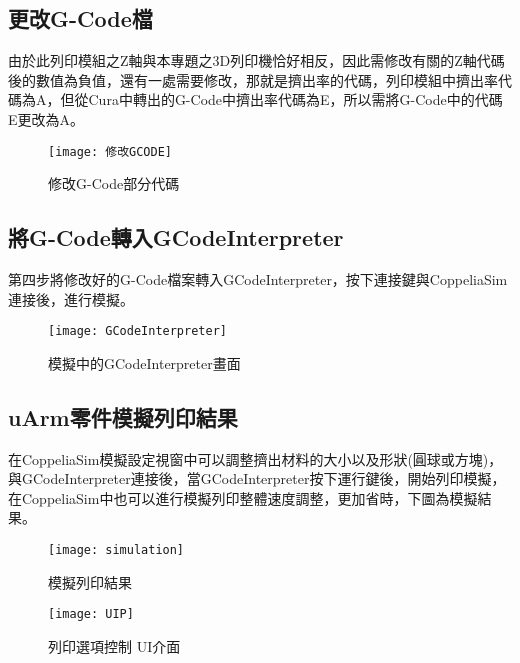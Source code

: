 \subsection{更改G-Code檔}
 由於此列印模組之Z軸與本專題之3D列印機恰好相反，因此需修改有關的Z軸代碼後的數值為負值，還有一處需要修改，那就是擠出率的代碼，列印模組中擠出率代碼為A，但從Cura中轉出的G-Code中擠出率代碼為E，所以需將G-Code中的代碼E更改為A。\\
\newpage
\begin{figure}
\begin{center}
\texttt{[image: 修改GCODE]}
\caption{\Large 修改G-Code部分代碼}\label{修改GCODE}
\end{center}
\end{figure}

\subsection{將G-Code轉入GCodeInterpreter}
 第四步將修改好的G-Code檔案轉入GCodeInterpreter，按下連接鍵與CoppeliaSim連接後，進行模擬。\\
\begin{figure}
\begin{center}
\texttt{[image: GCodeInterpreter]}
\caption{\Large 模擬中的GCodeInterpreter畫面}\label{GCodeInterpreter}
\end{center}
\end{figure}

\subsection{uArm零件模擬列印結果}
 在CoppeliaSim模擬設定視窗中可以調整擠出材料的大小以及形狀(圓球或方塊)，與GCodeInterpreter連接後，當GCodeInterpreter按下運行鍵後，開始列印模擬，在CoppeliaSim中也可以進行模擬列印整體速度調整，更加省時，下圖為模擬結果。\\
\begin{figure}
\begin{center}
\texttt{[image: simulation]}
\caption{\Large 模擬列印結果}\label{simulation}
\end{center}
\end{figure}

\begin{figure}
\begin{center}
\texttt{[image: UIP]}
\caption{\Large 列印選項控制 UI介面}\label{UIP}
\end{center}
\end{figure}

